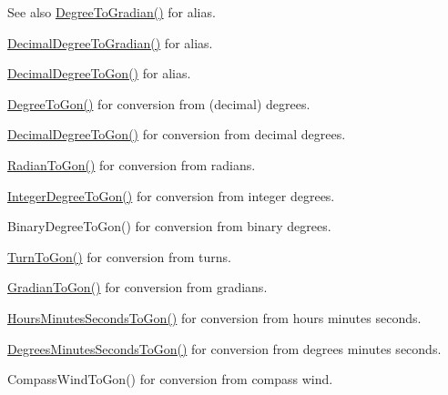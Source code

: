 \begin{DoxySeeAlso}{See also}
\mbox{\hyperlink{group___e_g_x_math-_conversions-_angle_conversions-_degree_ga25bb5506b3f66fff7a1b85bf7bd795b3}{Degree\+To\+Gradian()}} for alias. 

\mbox{\hyperlink{group___e_g_x_math-_conversions-_angle_conversions-_decimal_degree_ga3ac6f1ceb36a4938cdf3b55554734c99}{Decimal\+Degree\+To\+Gradian()}} for alias. 

\mbox{\hyperlink{group___e_g_x_math-_conversions-_angle_conversions-_decimal_degree_gaeb333a1ad0aeb913c025fbd1be85fcb3}{Decimal\+Degree\+To\+Gon()}} for alias. 

\mbox{\hyperlink{group___e_g_x_math-_conversions-_angle_conversions-_degree_ga87c3fab0867021e5d2501197b4db6194}{Degree\+To\+Gon()}} for conversion from (decimal) degrees. 

\mbox{\hyperlink{group___e_g_x_math-_conversions-_angle_conversions-_decimal_degree_gaeb333a1ad0aeb913c025fbd1be85fcb3}{Decimal\+Degree\+To\+Gon()}} for conversion from decimal degrees. 

\mbox{\hyperlink{group___e_g_x_math-_conversions-_angle_conversions-_radian_ga36912e5a810b64c271c4dafc17f4ca45}{Radian\+To\+Gon()}} for conversion from radians. 

\mbox{\hyperlink{group___e_g_x_math-_conversions-_angle_conversions-_integer_degree_ga6e5be425c37ad27319f09329156c64bb}{Integer\+Degree\+To\+Gon()}} for conversion from integer degrees. 

Binary\+Degree\+To\+Gon() for conversion from binary degrees. 

\mbox{\hyperlink{group___e_g_x_math-_conversions-_angle_conversions-_turn_gad81dd0bb1660ef24e28fa15b2403dec7}{Turn\+To\+Gon()}} for conversion from turns. 

\mbox{\hyperlink{group___e_g_x_math-_conversions-_angle_conversions-_gradian_gaff399262b6c8455e450e0a9dc8eb2ad1}{Gradian\+To\+Gon()}} for conversion from gradians. 

\mbox{\hyperlink{group___e_g_x_math-_conversions-_angle_conversions-_hours_minutes_seconds_ga356f1e89c3ea35a9d46967644d4ddfd3}{Hours\+Minutes\+Seconds\+To\+Gon()}} for conversion from hours minutes seconds. 

\mbox{\hyperlink{group___e_g_x_math-_conversions-_angle_conversions-_degrees_minutes_seconds_ga90b481c224ad083726ffe0fd35f4dbfc}{Degrees\+Minutes\+Seconds\+To\+Gon()}} for conversion from degrees minutes seconds. 

Compass\+Wind\+To\+Gon() for conversion from compass wind. 
\end{DoxySeeAlso}
\mbox{\label{group___e_g_x_math-_conversions-_angle_conversions-_degree_ga25bb5506b3f66fff7a1b85bf7bd795b3}} 
